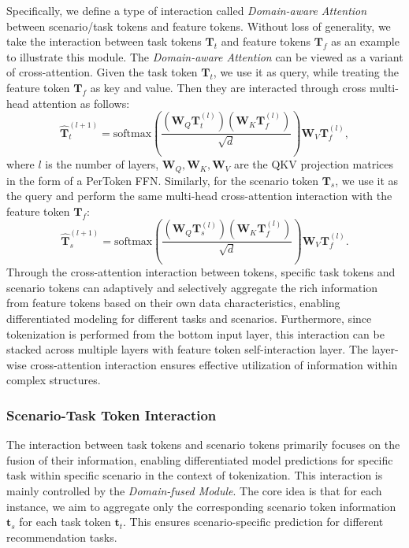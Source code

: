 Specifically, we define a type of interaction called \emph{Domain-aware Attention} between scenario/task tokens and feature tokens.
Without loss of generality, we take the interaction between task tokens $\bm{T}_{t}$ and feature tokens $\bm{T}_{f}$ as an example to illustrate this module.
The \emph{Domain-aware Attention} can be viewed as a variant of cross-attention.
Given the task token $\bm{T}_{t}$, we use it as query, while treating the feature token $\bm{T}_{f}$ as key and value.
Then they are interacted through cross multi-head attention as follows:
\begin{equation}
\label{eq-daa-task}
    \bm{\hat{T}}_t^{(l+1)} = \text{softmax}(\frac{(\bm{W}_Q\bm{T}_t^{(l)})(\bm{W}_K\bm{T}_{f}^{(l)})}{\sqrt{d}})\bm{W}_V\bm{T}_f^{(l)},
\end{equation}
where $l$ is the number of layers, $\bm{W}_Q, \bm{W}_K, \bm{W}_V$ are the QKV projection matrices in the form of a PerToken FFN.
Similarly, for the scenario token $\bm{T}_{s}$, we use it as the query and perform the same multi-head cross-attention interaction with the feature token $\bm{T}_{f}$:
\begin{equation}
\label{eq-daa-scenario}
    \bm{\hat{T}}_s^{(l+1)} = \text{softmax}(\frac{(\bm{W}_Q\bm{T}_s^{(l)})(\bm{W}_K\bm{T}_{f}^{(l)})}{\sqrt{d}})\bm{W}_V\bm{T}_f^{(l)}.
\end{equation}
Through the cross-attention interaction between tokens, specific task tokens and scenario tokens can adaptively and selectively aggregate the rich information from feature tokens based on their own data characteristics, enabling differentiated modeling for different tasks and scenarios. 
Furthermore, since tokenization is performed from the bottom input layer, this interaction can be stacked across multiple layers with feature token self-interaction layer.
The layer-wise cross-attention interaction ensures effective utilization of information within complex structures.

\subsubsection{Scenario-Task Token Interaction}
\label{subsubsec-interaction3}
The interaction between task tokens and scenario tokens primarily focuses on the fusion of their information, enabling differentiated model predictions for specific task within specific scenario in the context of tokenization.
This interaction is mainly controlled by the \emph{Domain-fused Module}.
The core idea is that for each instance, we aim to aggregate only the corresponding scenario token information $\bm{t}_{s}$ for each task token $\bm{t}_{t}$.
This ensures scenario-specific prediction for different recommendation tasks.

